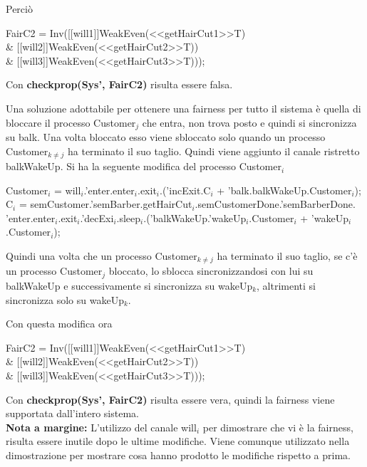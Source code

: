 Perciò

\begin{center}
	\textsf{FairC2 = Inv([[will1]]WeakEven(<<getHairCut1>>T) \\\& [[will2]]WeakEven(<<getHairCut2>>T)) \\\& [[will3]]WeakEven(<<getHairCut3>>T)));}
\end{center}

Con \textbf{checkprop(Sys', FairC2)} risulta essere falsa.

Una soluzione adottabile per ottenere una fairness per tutto il sistema è quella di bloccare il processo \textsf{Customer$_{j}$} che entra, non trova posto e quindi si sincronizza su \textsf{balk}. Una volta bloccato esso viene sbloccato solo quando un processo \textsf{Customer$_{k\not=j}$} ha terminato il suo taglio. Quindi viene aggiunto il canale ristretto \textsf{balkWakeUp}. Si ha la seguente modifica del processo \textsf{Customer$_{i}$}

\textsf{Customer$_{i}$ = will$_{i}$.'enter.enter$_{i}$.exit$_{i}$.('incExit.C$_{i}$ + 'balk.balkWakeUp.Customer$_{i}$);}\\
\textsf{C$_{i}$ = semCustomer.'semBarber.getHairCut$_{i}$.semCustomerDone.'semBarberDone.\\'enter.enter$_{i}$.exit$_{i}$.'decExi$_{i}$.sleep$_{i}$.('balkWakeUp.'wakeUp$_{i}$.Customer$_{i}$ + 'wakeUp$_{i}$.Customer$_{i}$);}

Quindi una volta che un processo \textsf{Customer$_{k\not=j}$} ha terminato il suo taglio, se c'è un processo \textsf{Customer$_{j}$} bloccato, lo sblocca sincronizzandosi con lui su \textsf{balkWakeUp} e successivamente si sincronizza su \textsf{wakeUp$_{k}$}, altrimenti si sincronizza solo su \textsf{wakeUp$_{k}$}.

Con questa modifica ora 

\begin{center}
	\textsf{FairC2 = Inv([[will1]]WeakEven(<<getHairCut1>>T) \\\& [[will2]]WeakEven(<<getHairCut2>>T)) \\\& [[will3]]WeakEven(<<getHairCut3>>T)));}
\end{center}

Con \textbf{checkprop(Sys', FairC2)} risulta essere vera, quindi la fairness viene supportata dall'intero sistema. \\

\textbf{Nota a margine:} L'utilizzo del canale \textsf{will$_{i}$} per dimostrare che vi è la fairness, risulta essere inutile dopo le ultime modifiche. Viene comunque utilizzato nella dimostrazione per mostrare cosa hanno prodotto le modifiche rispetto a prima.